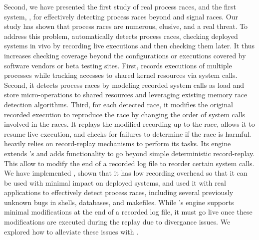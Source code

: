 Second, we have presented the first study of real process races, and the first
system, \racepro, for effectively detecting process races beyond \toctou
and signal races.   Our study has shown that process races are
numerous, elusive, and a real threat.  To address this problem, \racepro
automatically detects process races, checking deployed
systems in vivo by recording live executions and then checking
them later.  It thus increases checking coverage beyond the
configurations or executions covered by software vendors or beta
testing sites.  First, \racepro records executions of multiple processes
while tracking accesses to shared kernel resources via system
calls. Second, it detects process races by modeling recorded system
calls as load and store micro-operations to shared resources and
leveraging existing memory race detection algorithms.  Third, for each
detected race, it modifies the original recorded execution to
reproduce the race by changing the order of system calls involved in
the races.  It replays the modified recording up to the race, allows
it to resume live execution, and checks for failures to determine if
the race is harmful.
\racepro heavily relies on record-replay mechanisms to perform its tasks.
Its engine extends \scribe's and adds functionality to go beyond simple
deterministic record-replay. This allow \racepro to modify the end of
a recorded log file to reorder certain system calls.
We have implemented \racepro, shown that it has
low recording overhead so that it can be used with minimal impact on
deployed systems, and used it with real applications to effectively
detect \nracepro process races, including several previously unknown
bugs in shells, databases, and makefiles.
While \racepro's engine supports minimal modifications at the end
of a recorded log file, it must go live once these modifications are
executed during the replay due to divergance issues. We explored
how to alleviate these issues with \dora.

